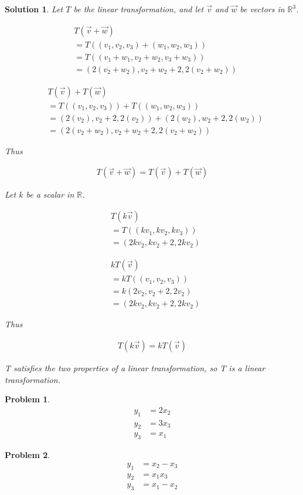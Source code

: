 \documentclass{article}
\newtheorem{problem}{Problem}
\newtheorem*{solution}{Solution}
\begin{document}
\begin{solution}
Let $T$ be the linear transformation, and let $\vec{v}$ and $\vec{w}$ be vectors in $\mathbb{R}^3$.

\begin{align*}
& T(\vec{v} + \vec{w}) \\
&= T((v_{1}, v_{2}, v_{3}) + (w_{1}, w_{2}, w_{3})) \\
&= T((v_{1} + w_{1}, v_{2} + w_{2}, v_{3} + w_{3})) \\
&= (2(v_{2} + w_{2}), v_{2} + w_{2} + 2, 2(v_{2} + w_{2}))
\end{align*}

\begin{align*}
& T(\vec{v}) + T(\vec{w}) \\
&= T((v_{1}, v_{2}, v_{3})) + T((w_{1}, w_{2}, w_{3})) \\
&= (2(v_{2}), v_{2} + 2, 2(v_{2})) + (2(w_{2}), w_{2} + 2, 2(w_{2})) \\
&= (2(v_{2} + w_{2}), v_{2} + w_{2} + 2, 2(v_{2} + w_{2}))
\end{align*}

Thus 

\begin{align*}
T(\vec{v} + \vec{w}) = T(\vec{v}) + T(\vec{w})
\end{align*}

Let $k$ be a scalar in $\mathbb{R}$.

\begin{align*}
& T(k\vec{v}) \\
&= T((kv_{1}, kv_{2}, kv_{3})) \\
&= (2kv_{2}, kv_{2} + 2, 2kv_{2}) 
\end{align*}

\begin{align*}
& kT(\vec{v}) \\
&= kT((v_{1}, v_{2}, v_{3})) \\
&= k(2v_{2}, v_{2} + 2, 2v_{2}) \\
&= (2kv_{2}, kv_{2} + 2, 2kv_{2}) 
\end{align*}

Thus 

\begin{align*}
T(k\vec{v}) = kT(\vec{v})
\end{align*}

T satisfies the two properties of a linear transformation, so T is a linear transformation.

\end{solution}

\begin{problem}

\begin{align*}
y_{1} &= 2x_{2} \\
y_{2} &= 3x_{3}  \\
y_{3} &= x_{1}
\end{align*}

\end{problem}

\begin{problem}

\begin{align*}
y_{1} &= x_{2} - x_{3} \\
y_{2} &= x_{1} x_{3}  \\
y_{3} &= x_{1} - x_{2}
\end{align*}

\end{problem}
\end{document}
